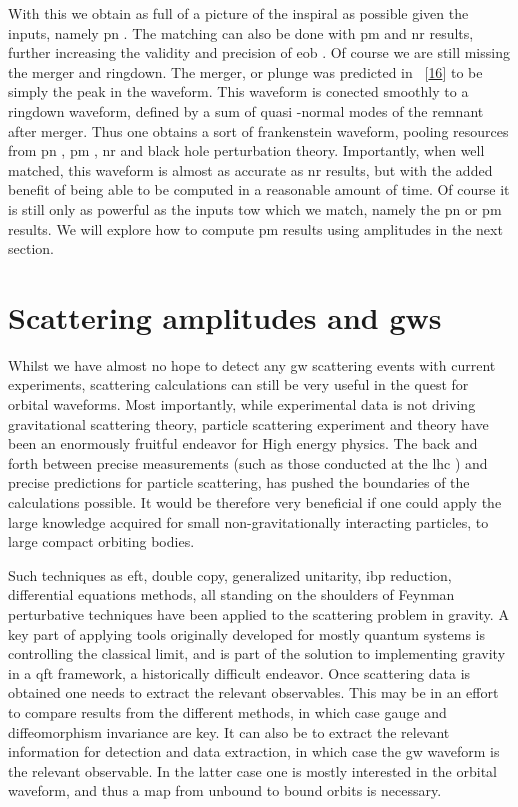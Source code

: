 \documentclass[
  10pt,
  a4paper,
  DIV=11,
  numbers=noendperiod,
  twoside]{scrreprt}
\DeclareRobustCommand{\[}{\begin{equation}}
\DeclareRobustCommand{\]}{\end{equation}}
\begin{document}
With this we obtain as full of a picture of the inspiral as possible
given the inputs, namely \gls{pn} . The matching can also be done with
\gls{pm} and \gls{nr} results, further increasing the validity and
precision of \gls{eob} . Of course we are still missing the merger and
ringdown. The merger, or plunge was predicted in
~{[}\protect\hyperlink{ref-Buonanno:2000ef}{16}{]} to be simply the peak
in the waveform. This waveform is conected smoothly to a ringdown
waveform, defined by a sum of quasi -normal modes of the remnant after
merger. Thus one obtains a sort of frankenstein waveform, pooling
resources from \gls{pn} , \gls{pm} , \gls{nr} and black hole
perturbation theory. Importantly, when well matched, this waveform is
almost as accurate as \gls{nr} results, but with the added benefit of
being able to be computed in a reasonable amount of time. Of course it
is still only as powerful as the inputs tow which we match, namely the
\gls{pn} or \gls{pm} results. We will explore how to compute \gls{pm}
results using amplitudes in the next section.


\hypertarget{scattering-amplitudes-and-gws}{%
\chapter{\texorpdfstring{Scattering amplitudes and
\gls{gw}s}{Scattering amplitudes and }}\label{scattering-amplitudes-and-gws}}

Whilst we have almost no hope to detect any \gls{gw} scattering events
with current experiments, scattering calculations can still be very
useful in the quest for orbital waveforms. Most importantly, while
experimental data is not driving gravitational scattering theory,
particle scattering experiment and theory have been an enormously
fruitful endeavor for High energy physics. The back and forth between
precise measurements (such as those conducted at the \gls{lhc} ) and
precise predictions for particle scattering, has pushed the boundaries
of the calculations possible. It would be therefore very beneficial if
one could apply the large knowledge acquired for small
non-gravitationally interacting particles, to large compact orbiting
bodies.

Such techniques as \gls{eft}, double copy, generalized unitarity,
\gls{ibp} reduction, differential equations methods, all standing on the
shoulders of Feynman perturbative techniques have been applied to the
scattering problem in gravity. A key part of applying tools originally
developed for mostly quantum systems is controlling the classical limit,
and is part of the solution to implementing gravity in a \gls{qft}
framework, a historically difficult endeavor. Once scattering data is
obtained one needs to extract the relevant observables. This may be in
an effort to compare results from the different methods, in which case
gauge and diffeomorphism invariance are key. It can also be to extract
the relevant information for detection and data extraction, in which
case the \gls{gw} waveform is the relevant observable. In the latter
case one is mostly interested in the orbital waveform, and thus a map
from unbound to bound orbits is necessary.
\end{document}
